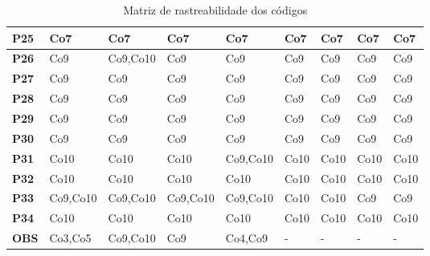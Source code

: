 \begin{table}[!htb]
\begin{tabular}{|M{1.0cm}|M{1.6cm}|M{1.6cm}|M{1.6cm}|M{1.6cm}|M{1.6cm}|M{1.6cm}|M{1.6cm}|M{1.6cm}|}
\textbf{P25}                   & Co7            & Co7            & Co7            & Co7            & Co7            & Co7            & Co7            & Co7            \\ \hline

\textbf{P26}                   & Co9            & Co9,Co10       & Co9            & Co9            & Co9            & Co9            & Co9            & Co9            \\ \hline

\textbf{P27}                   & Co9            & Co9            & Co9            & Co9            & Co9            & Co9            & Co9            & Co9            \\ \hline

\textbf{P28}                   & Co9            & Co9            & Co9            & Co9            & Co9            & Co9            & Co9            & Co9            \\ \hline

\textbf{P29}                   & Co9            & Co9            & Co9            & Co9            & Co9            & Co9            & Co9            & Co9            \\ \hline

\textbf{P30}                   & Co9            & Co9            & Co9            & Co9            & Co9            & Co9            & Co9            & Co9            \\ \hline

\textbf{P31}                   & Co10           & Co10           & Co10           & Co9,Co10       & Co10           & Co10           & Co10           & Co10           \\ \hline

\textbf{P32}                   & Co10           & Co10           & Co10           & Co10           & Co10           & Co10           & Co10           & Co10           \\ \hline

\textbf{P33}                   & Co9,Co10       & Co9,Co10       & Co9,Co10       & Co9,Co10       & Co10           & Co10           & Co9            & Co9            \\ \hline

\textbf{P34}                   & Co10           & Co10           & Co10           & Co10           & Co10           & Co10           & Co10           & Co10           \\ \hline

\textbf{OBS}                   & Co3,Co5        & Co9,Co10       & Co9            & Co4,Co9        &   -             &        -        &      -          &      -          \\ \hline

\end{tabular}
\caption{Matriz de rastreabilidade dos códigos}
\end{table}

